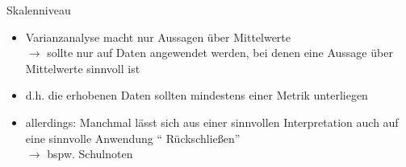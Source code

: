 \documentclass{beamer}
\begin{document}
	\begin{frame}{Skalenniveau}
		\begin{itemize}
			\item Varianzanalyse macht nur Aussagen über Mittelwerte\\
			$\rightarrow$ sollte nur auf Daten angewendet werden, bei denen eine Aussage über Mittelwerte sinnvoll ist
			\item d.h. die erhobenen Daten sollten mindestens einer Metrik unterliegen
			\item \alert{allerdings:} Manchmal lässt sich aus einer sinnvollen Interpretation auch auf eine sinnvolle Anwendung `` Rückschließen'' \\
			$\rightarrow$ bspw. Schulnoten
		\end{itemize}
	\end{frame}
	
\end{document}
